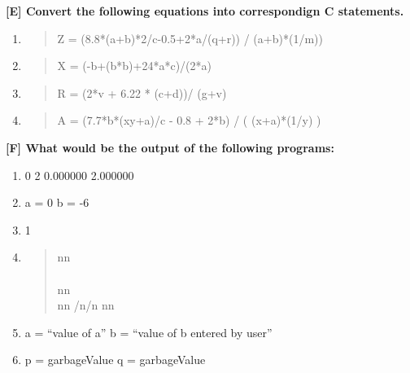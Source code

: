 \documentclass{report}
\begin{document}
\textbf{[E] Convert the following equations into correspondign C statements.}
\begin{enumerate}
    \renewcommand{\labelenumi}{\alph{enumi}}
  \item \begin{quote}
      Z = (8.8*(a+b)*2/c-0.5+2*a/(q+r)) / (a+b)*(1/m))
  \end{quote}
  \item \begin{quote}
      X = (-b+(b*b)+24*a*c)/(2*a)
  \end{quote}
  \item \begin{quote}
      R = (2*v + 6.22 * (c+d))/ (g+v)
  \end{quote}
  \item \begin{quote}
      A = (7.7*b*(xy+a)/c - 0.8 + 2*b) / ( (x+a)*(1/y) )
  \end{quote}
\end{enumerate}

\textbf{[F] What would be the output of the following programs:}
\begin{enumerate}
    \renewcommand{\labelenumi}{\alph{enumi}}
  \item 0 2 0.000000 2.000000
  \item a = 0 b = -6
  \item 1
  \item \begin{quote}
      nn\\
\\
      nn\\
      nn /n/n nn\\
  \end{quote}
  \item a = ``value of a'' b = ``value of b entered by user''
  \item p = garbageValue q = garbageValue
\end{enumerate}
\end{document}
